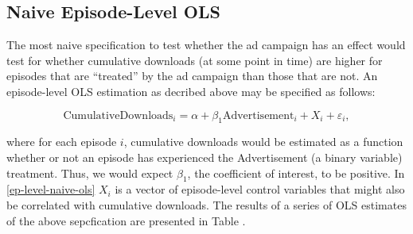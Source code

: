 \documentclass[11pt, letterpaper, twoside]{article}
\begin{document}
\subsection{Naive Episode-Level OLS}
The most naive specification to test whether the ad campaign has an effect would test for whether cumulative downloads (at some point in time) are higher for episodes that are ``treated'' by the ad campaign than those that are not. An episode-level OLS estimation as decribed above may be specified as follows:

\begin{equation}
  \label{ep-level-naive-ols}
  \text{CumulativeDownloads}_i = \alpha + \beta_1\text{Advertisement}_i + X_i +\varepsilon_i, 
\end{equation}

where for each episode $i$, cumulative downloads would be estimated as a function whether or not an episode has experienced the Advertisement (a binary variable) treatment. Thus, we would expect $\beta_1$, the coefficient of interest, to be positive. In \ref{ep-level-naive-ols} $X_i$ is a vector of episode-level control variables that might also be correlated with cumulative downloads. The results of a series of OLS estimates of the above sepcfication are presented in Table .


\end{document}
